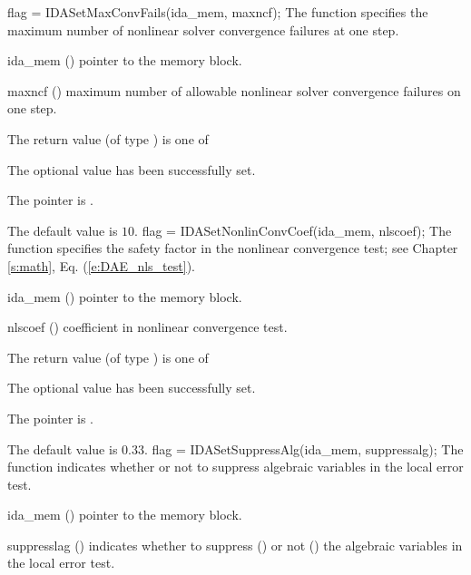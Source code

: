 {
flag = IDASetMaxConvFails(ida\_mem, maxncf);
}
{
  The function  specifies the
  maximum number of nonlinear solver convergence failures at one step.
}
{
  \begin{args}
  \item[ida\_mem] ()
    pointer to the {\ida} memory block.
  \item[maxncf] ()
    maximum number of allowable nonlinear solver convergence failures
    on one step.
  \end{args}
}
{
  The return value  (of type ) is one of
  \begin{args}
  \item[\Id{IDA\_SUCCESS}] 
    The optional value has been successfully set.
  \item[\Id{IDA\_MEM\_NULL}]
    The  pointer is .
  \end{args}
}
{
  The default value is $10$.
}
{
flag = IDASetNonlinConvCoef(ida\_mem, nlscoef);
}
{
  The function  specifies the safety factor
  in the nonlinear convergence test;
  see Chapter \ref{s:math}, Eq. (\ref{e:DAE_nls_test}).
}
{
  \begin{args}
  \item[ida\_mem] ()
    pointer to the {\ida} memory block.
  \item[nlscoef] ()
    coefficient in nonlinear convergence test.
  \end{args}
}
{
  The return value  (of type ) is one of
  \begin{args}
  \item[\Id{IDA\_SUCCESS}] 
    The optional value has been successfully set.
  \item[\Id{IDA\_MEM\_NULL}]
    The  pointer is .
  \end{args}
}
{
  The default value is $0.33$.
}
{
flag = IDASetSuppressAlg(ida\_mem, suppressalg);
}
{
  The function  indicates whether or not to
  suppress algebraic variables in the local error test.
}
{
  \begin{args}[suppressalg]
  \item[ida\_mem] ()
    pointer to the {\ida} memory block.
  \item[suppresslag] ()
    indicates whether to suppress () or not
    () the algebraic variables in the local error test.
  \end{args}
}
